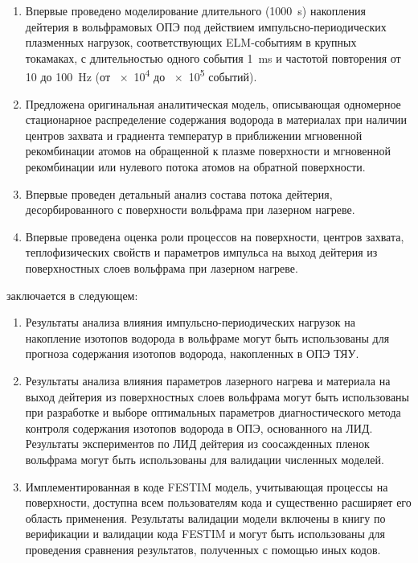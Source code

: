 {\novelty}
\begin{enumerate}[beginpenalty=10000] %
    \item Впервые проведено моделирование длительного (\SI{1000}{\second}) накопления дейтерия в вольфрамовых ОПЭ под действием импульсно-периодических плазменных нагрузок, соответствующих ELM-событиям в крупных токамаках, с длительностью одного события \SI{1}{\milli\second} и частотой повторения от \num{10} до \SI{100}{\hertz} (от \num{e4} до \num{e5} событий).
    \item Предложена оригинальная аналитическая модель, описывающая одномерное стационарное распределение содержания водорода в материалах при наличии центров захвата и градиента температур в приближении мгновенной рекомбинации атомов на обращенной к плазме поверхности и мгновенной рекомбинации или нулевого потока атомов на обратной поверхности.
    \item Впервые проведен детальный анализ состава потока дейтерия, десорбированного с поверхности вольфрама при лазерном нагреве.
    \item Впервые проведена оценка роли процессов на поверхности, центров захвата, теплофизических свойств и параметров импульса на выход дейтерия из поверхностных слоев вольфрама при лазерном нагреве.
\end{enumerate}

{\influence} заключается в следующем:
\begin{enumerate}[beginpenalty=10000] %
    \item Результаты анализа влияния импульсно-периодических нагрузок на накопление изотопов водорода в вольфраме могут быть использованы для прогноза содержания изотопов водорода, накопленных в ОПЭ ТЯУ.
    \item Результаты анализа влияния параметров лазерного нагрева и материала на выход дейтерия из поверхностных слоев вольфрама могут быть использованы при разработке и выборе оптимальных параметров диагностического метода контроля содержания изотопов водорода в ОПЭ, основанного на ЛИД. Результаты экспериментов по ЛИД дейтерия из соосажденных пленок вольфрама могут быть использованы для валидации численных моделей.
    \item Имплементированная в коде FESTIM модель, учитывающая процессы на поверхности, доступна всем пользователям кода и существенно расширяет его область применения. Результаты валидации модели включены в книгу по верификации и валидации кода FESTIM и могут быть использованы для проведения сравнения результатов, полученных с помощью иных кодов.
\end{enumerate}

